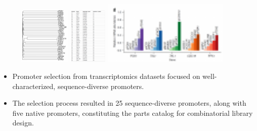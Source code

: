 \documentclass{beamer}
\begin{document}
\begin{frame}{}
	    \begin{figure}
		\centering
		\includegraphics[width=2.5cm]{pic/图片2.pdf}
		\includegraphics[width=1.8cm]{pic/图片3.pdf}
		\includegraphics[width=6cm]{pic/图片4.pdf}
 	    \end{figure}
    \begin{itemize} [<+-| alert@+>] %
        \item Promoter selection from transcriptomics datasets focused on well-characterized, sequence-diverse promoters.
        \item  The selection process resulted in 25 sequence-diverse promoters, along with five native promoters, constituting the parts catalog for combinatorial library design.
        
    \end{itemize}  
      
\end{frame}
\end{document}
